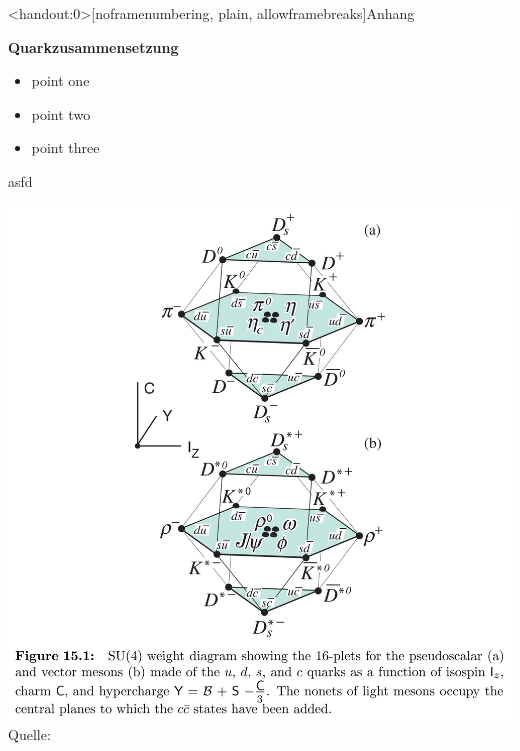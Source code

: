 \documentclass[handout]{beamer} %
\newcommand{\figcite}[1]{\\[-3mm]{\tiny Quelle: \cite{#1}}}
\begin{document}
  \begin{frame}<handout:0>[noframenumbering, plain, allowframebreaks]{Anhang}
      \begin{minipage}{0.4\textwidth}
        \textbf{Quarkzusammensetzung}
        \begin{itemize}
          \item point one \pause
          \item point two \pause
          \item point three
        \end{itemize}
      \end{minipage}
      \hfill
      \begin{minipage}{0.58\textwidth}
        asfd
      \end{minipage}
      
    \pagebreak
      \includegraphics[height=0.9\textheight, width=\linewidth, keepaspectratio]{Images/90f0590a-0e4a-4d62-bd40-0bcce4be9feb.jpg}%
      \figcite{C.Amsler.2017}
    
    \end{frame}


    
\end{document}

